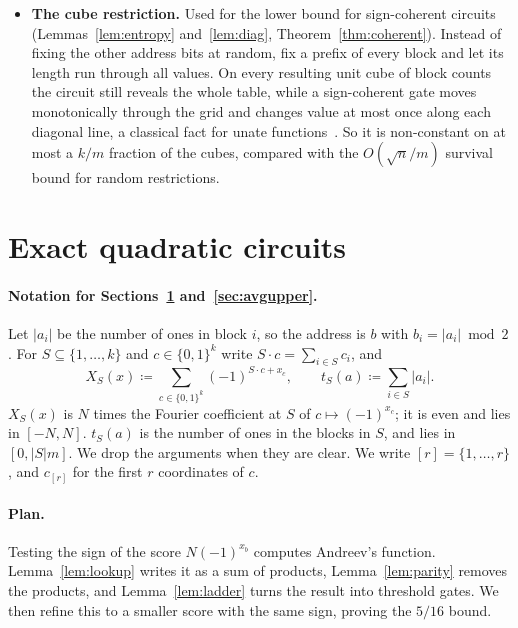\documentclass[11pt,letterpaper]{article}
\theoremstyle{remark}
\newcommand{\bits}{\{0,1\}}
\begin{document}
\begin{itemize}
      Theorem~\ref{thm:lower}). Instead of bounding the
      survivors by Markov's inequality, we bound the correlation for all
      survivor counts at once and average with Cauchy--Schwarz. This improves
      $\varepsilon^3$ to $\varepsilon^2$.
\item \textbf{The cube restriction.} Used for the lower bound for
      sign-coherent circuits (Lemmas~\ref{lem:entropy} and~\ref{lem:diag},
      Theorem~\ref{thm:coherent}). Instead of fixing the other address bits at
      random, fix a prefix of every block and let its length run through all
      values. On every resulting unit cube of block counts the circuit still
      reveals the whole table, while a sign-coherent gate moves monotonically
      through the grid and changes value at most once along each diagonal
      line, a classical fact for unate functions~\cite[Lemma~2.1]{IPS}. So it
      is non-constant on at most a $k/m$ fraction of the cubes, compared
      with the $O(\sqrt n/m)$ survival bound for random restrictions.
\end{itemize}

\section{Exact quadratic circuits}\label{sec:upper}

\paragraph*{Notation for Sections~\ref{sec:upper} and~\ref{sec:avgupper}.}
Let $|a_i|$ be the number of ones in block $i$, so the address is $b$
with $b_i=|a_i|\bmod2$.
For $S\subseteq\{1,\dots,k\}$ and $c\in\bits^k$ write $S\cdot c=\sum_{i\in S}c_i$, and
\[
X_S(x)\coloneqq\sum_{c\in\bits^k}(-1)^{S\cdot c+x_c},\qquad
t_S(a)\coloneqq\sum_{i\in S}|a_i| .
\]
$X_S(x)$ is $N$ times the Fourier coefficient at $S$ of $c\mapsto(-1)^{x_c}$;
it is even and lies in $[-N,N]$. $t_S(a)$ is the number of ones in the blocks in
$S$, and lies in $[0,|S|m]$. We drop the arguments when they are clear.
We write $[r]=\{1,\dots,r\}$, and $c_{[r]}$ for the first $r$ coordinates of $c$.

\paragraph*{Plan.}
Testing the sign of the score $N(-1)^{x_b}$ computes Andreev's function.
Lemma~\ref{lem:lookup} writes it as a sum of products,
Lemma~\ref{lem:parity} removes the products, and Lemma~\ref{lem:ladder}
turns the result into threshold gates. We then refine this to a smaller score
with the same sign, proving the $5/16$ bound.
\end{document}
